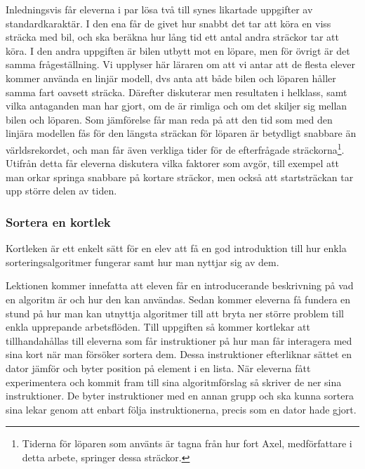     \textcolor{lila}{Inledningsvis får eleverna i par lösa två till synes likartade uppgifter av standardkaraktär. I den ena får de givet hur snabbt det tar att köra en viss sträcka med bil, och ska beräkna hur lång tid ett antal andra sträckor tar att köra. I den andra uppgiften är bilen utbytt mot en löpare, men för övrigt är det samma frågeställning. Vi upplyser här läraren om att vi antar att de flesta elever kommer använda en linjär modell, dvs anta att både bilen och löparen håller samma fart oavsett sträcka. Därefter diskuterar men resultaten i helklass, samt vilka antaganden man har gjort, om de är rimliga och om det skiljer sig mellan bilen och löparen. Som jämförelse får man reda på att den tid som med den linjära modellen fås för den längsta sträckan för löparen är betydligt snabbare än världsrekordet, och man får även verkliga tider för de efterfrågade sträckorna\footnote{Tiderna för löparen som använts är tagna från hur fort Axel, medförfattare i detta arbete, springer dessa sträckor.}. Utifrån detta får eleverna diskutera vilka faktorer som avgör, till exempel att man orkar springa snabbare på kortare sträckor, men också att startsträckan tar upp större delen av tiden.}
    
\subsubsection{Sortera en kortlek}
    \label{sec:Sortera}
    
    \textcolor{WildStrawberry}{
        Kortleken är ett enkelt sätt för en elev att få en god introduktion till hur enkla sorteringsalgoritmer fungerar samt hur man nyttjar sig av dem.}
        
    \textcolor{WildStrawberry}{
        Lektionen kommer innefatta att eleven får en introducerande beskrivning på vad en algoritm är och hur den kan användas. Sedan kommer eleverna få fundera en stund på hur man kan utnyttja algoritmer till att bryta ner större problem till enkla upprepande arbetsflöden. Till uppgiften så kommer kortlekar att tillhandahållas till eleverna som får instruktioner på hur man får interagera med sina kort när man försöker sortera dem. Dessa instruktioner efterliknar sättet en dator jämför och byter position på element i en lista. När eleverna fått experimentera och kommit fram till sina algoritmförslag så skriver de ner sina instruktioner. De byter instruktioner med en annan grupp och ska kunna sortera sina lekar genom att enbart följa instruktionerna, precis som en dator hade gjort. }
        
